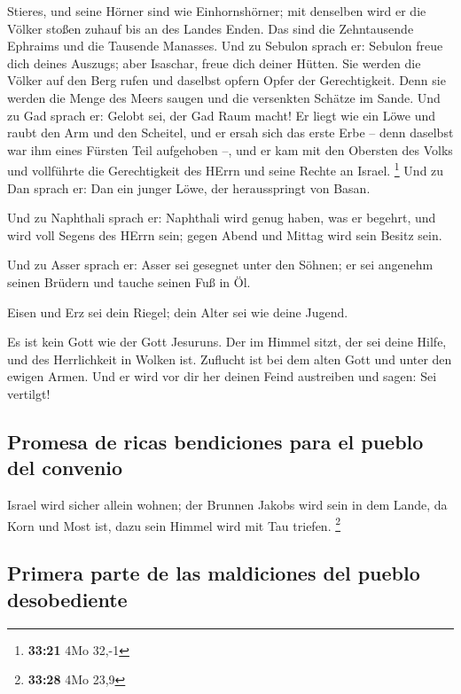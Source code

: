 Stieres, und seine Hörner sind wie Einhornshörner; mit denselben wird er
die Völker stoßen zuhauf bis an des Landes Enden. Das sind die
Zehntausende Ephraims und die Tausende Manasses.  Und zu
Sebulon sprach er: Sebulon freue dich deines Auszugs; aber Isaschar,
freue dich deiner Hütten.  Sie werden die Völker auf den
Berg rufen und daselbst opfern Opfer der Gerechtigkeit. Denn sie werden
die Menge des Meers saugen und die versenkten Schätze im Sande.
 Und zu Gad sprach er: Gelobt sei, der Gad Raum macht! Er
liegt wie ein Löwe und raubt den Arm und den Scheitel, 
und er ersah sich das erste Erbe -- denn daselbst war ihm eines Fürsten
Teil aufgehoben --, und er kam mit den Obersten des Volks und vollführte
die Gerechtigkeit des HErrn und seine Rechte an Israel. \footnote{\textbf{33:21}
  4Mo 32,-1}  Und zu Dan sprach er: Dan ein junger Löwe,
der herausspringt von Basan.

 Und zu Naphthali sprach er: Naphthali wird genug haben,
was er begehrt, und wird voll Segens des HErrn sein; gegen Abend und
Mittag wird sein Besitz sein.

 Und zu Asser sprach er: Asser sei gesegnet unter den
Söhnen; er sei angenehm seinen Brüdern und tauche seinen Fuß in Öl.

 Eisen und Erz sei dein Riegel; dein Alter sei wie deine
Jugend.

 Es ist kein Gott wie der Gott Jesuruns. Der im Himmel
sitzt, der sei deine Hilfe, und des Herrlichkeit in Wolken ist.
 Zuflucht ist bei dem alten Gott und unter den ewigen
Armen. Und er wird vor dir her deinen Feind austreiben und sagen: Sei
vertilgt!

\hypertarget{promesa-de-ricas-bendiciones-para-el-pueblo-del-convenio}{%
\subsection{Promesa de ricas bendiciones para el pueblo del
convenio}\label{promesa-de-ricas-bendiciones-para-el-pueblo-del-convenio}}

 Israel wird sicher allein wohnen; der Brunnen Jakobs
wird sein in dem Lande, da Korn und Most ist, dazu sein Himmel wird mit
Tau triefen. \footnote{\textbf{33:28} 4Mo 23,9}

\hypertarget{primera-parte-de-las-maldiciones-del-pueblo-desobediente}{%
\subsection{Primera parte de las maldiciones del pueblo
desobediente}\label{primera-parte-de-las-maldiciones-del-pueblo-desobediente}}

